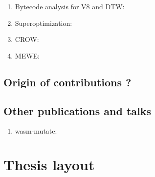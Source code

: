 \begin{enumerate}[label=(\subscript{P}{{\arabic*}})]
    \item Bytecode analysis for V8 and DTW: \todo{}
    \item Superoptimization: \todo{}
    \item CROW: \todo{}
    \item MEWE: \todo{}
\end{enumerate}

\subsection*{Origin of contributions ?}

\subsection*{Other publications and talks}

\begin{enumerate}
    \item wasm-mutate: \todo{}
\end{enumerate}

\section*{Thesis layout}